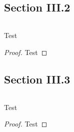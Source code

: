 \documentclass[notheorems, compress]{beamer}
\begin{document}
\subsection{Section III.2}
\begin{frame}{$ $}
    \begin{lemma}[Test]\label{lem:Test}
        Test
    \end{lemma}
    \begin{proof}
        Test
    \end{proof}
\end{frame}

\subsection{Section III.3}
\begin{frame}{$ $}
    \begin{corollary}[Test]\label{cor:Test}
        Test
    \end{corollary}
    \begin{proof}
        Test
    \end{proof}
\end{frame}
\end{document}
